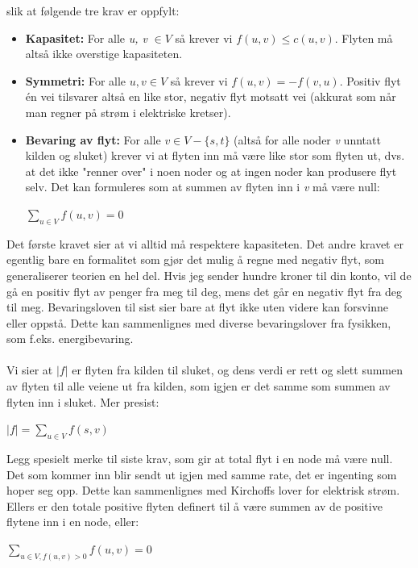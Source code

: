 \noindent slik at følgende tre krav er oppfylt:
\begin{itemize}
    \item \textbf{Kapasitet:} For alle \textit{u, v} $\in V$ så krever vi $f (u,v) \leq c (u,v)$. Flyten må altså ikke overstige kapasiteten.
    \item \textbf{Symmetri:} For alle $u,v \in V$ så krever vi $f (u,v) = -f(v,u)$. Positiv flyt én vei tilsvarer altså en like stor, negativ flyt motsatt vei (akkurat som når man regner på strøm i elektriske kretser).
    \item \textbf{Bevaring av flyt:} For alle $v \in V - \{s,t\}$ (altså for alle noder \textit{v} unntatt kilden og sluket) krever vi at flyten inn må være like stor som flyten ut, dvs. at det ikke "renner over" i noen noder og at ingen noder kan produsere flyt selv. Det kan formuleres som at summen av flyten inn i \textit{v} må være null:
    \begin{center}
    $\sum\limits_{u \in V} f(u,v) = 0$ 
    \end{center}
\end{itemize}

\noindent Det første kravet sier at vi alltid må respektere kapasiteten. Det andre kravet er egentlig bare en formalitet som gjør det mulig å regne med negativ flyt, som generaliserer teorien en hel del. Hvis jeg sender hundre kroner til din konto, vil de gå en positiv flyt av penger fra meg til deg, mens det går en negativ flyt fra deg til meg. Bevaringsloven til sist sier bare at flyt ikke uten videre kan forsvinne eller oppstå. Dette kan sammenlignes med diverse bevaringslover fra fysikken, som f.eks. energibevaring.
\\\\
Vi sier at $|f|$ er flyten fra kilden til sluket, og dens verdi er rett og slett summen av flyten til alle veiene ut fra kilden, som igjen er det samme som summen av flyten inn i sluket. Mer presist:
\begin{center}
    $|f| = \sum\limits_{u \in V} f(s,v)$ 
    \end{center}
    
\noindent Legg spesielt merke til siste krav, som gir at total flyt i en node må være null. Det som kommer inn blir sendt ut igjen med samme rate, det er ingenting som hoper seg opp. Dette kan sammenlignes med Kirchoffs lover for elektrisk strøm. Ellers er den totale positive flyten definert til å være summen av de positive flytene inn i en node, eller:
\begin{center}
    $\sum\limits_{u \in V, f(u,v)>0} f(u,v) = 0$ 
    \end{center}
    
